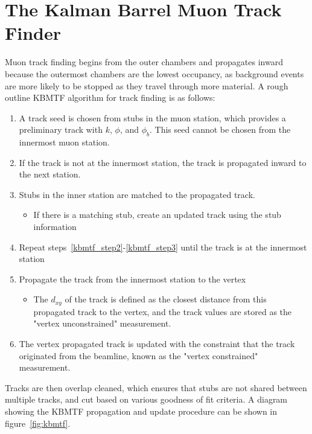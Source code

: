 \section{The Kalman Barrel Muon Track Finder} \label{sec:kbmtf}
Muon track finding begins from the outer chambers and propagates inward because the outermost chambers are the lowest occupancy, as background events are more likely to be stopped as they travel through more material. A rough outline KBMTF algorithm for track finding is as follows:
\begin{enumerate}
	\item A track seed is chosen from stubs in the muon station, which provides a preliminary track with $k$, $\phi$, and $\phi_{b}$. This seed cannot be chosen from the innermost muon station.
	\item If the track is not at the innermost station, the track is propagated inward to the next station. \label{kbmtf_step2}
	\item Stubs in the inner station are matched to the propagated track. \label{kbmtf_step3}
	\begin{itemize}
		\item If there is a matching stub, create an updated track using the stub information
	\end{itemize}
	\item Repeat steps~\ref{kbmtf_step2}-\ref{kbmtf_step3} until the track is at the innermost station
	\item Propagate the track from the innermost station to the vertex
	\begin{itemize}
		\item The $d_{xy}$ of the track is defined as the closest distance from this propagated track to the vertex, and the track values are stored as the "vertex unconstrained" measurement.
	\end{itemize} \label{kbmtf_step4}
	\item The vertex propagated track is updated with the constraint that the track originated from the beamline, known as the "vertex constrained" measurement. \label{kbmtf_step5}
\end{enumerate}

Tracks are then overlap cleaned, which ensures that stubs are not shared between multiple tracks, and cut based on various goodness of fit criteria. A diagram showing the KBMTF propagation and update procedure can be shown in figure~\ref{fig:kbmtf}.

